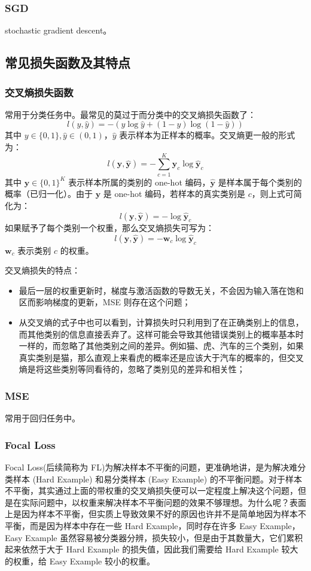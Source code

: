 \subsubsection{SGD}
stochastic gradient descent。

\subsection{常见损失函数及其特点}
\subsubsection{交叉熵损失函数}
常用于分类任务中。最常见的莫过于而分类中的交叉熵损失函数了：
$$
l(y, \hat{y}) = -(y \log \hat{y} + (1-y) \log (1-\hat{y}))
$$
其中 $y \in \{0, 1\}, \hat{y} \in (0, 1)$，$\hat y$ 表示样本为正样本的概率。交叉熵更一般的形式为：
$$
l(\boldsymbol{y}, \hat{\boldsymbol{y}}) = - \sum_{c=1}^K \boldsymbol{y}_c \log \hat{\boldsymbol{y}}_c
$$
其中 $\boldsymbol{y} \in \{0,1\}^K$ 表示样本所属的类别的 one-hot 编码，$\hat{\boldsymbol{y}}$ 是样本属于每个类别的概率（已归一化）。由于 $\boldsymbol{y}$ 是 one-hot 编码，若样本的真实类别是 $c$，则上式可简化为：
$$
l(\boldsymbol{y}, \hat{\boldsymbol{y}}) = - \log \hat{\boldsymbol{y}}_c
$$
如果赋予了每个类别一个权重，那么交叉熵损失可写为：
$$
l(\boldsymbol{y}, \hat{\boldsymbol{y}}) = - \boldsymbol{w}_c\log \hat{\boldsymbol{y}}_c
$$
$\boldsymbol{w}_c$ 表示类别 $c$ 的权重。

交叉熵损失的特点：
\begin{itemize}
	\item 最后一层的权重更新时，梯度与激活函数的导数无关，不会因为输入落在饱和区而影响梯度的更新，MSE 则存在这个问题；
	
	\item 从交叉熵的式子中也可以看到，计算损失时只利用到了在正确类别上的信息，而其他类别的信息直接丢弃了。这样可能会导致其他错误类别上的概率基本时一样的，而忽略了其他类别之间的差异。例如猫、虎、汽车的三个类别，如果真实类别是猫，那么直观上来看虎的概率还是应该大于汽车的概率的，但交叉熵是将这些类别等同看待的，忽略了类别见的差异和相关性；	
\end{itemize}


\subsubsection{MSE}
常用于回归任务中。

\subsubsection{Focal Loss}
Focal Loss(后续简称为 FL)为解决样本不平衡的问题，更准确地讲，是为解决难分类样本 (Hard Example) 和易分类样本 (Easy Example) 的不平衡问题。对于样本不平衡，其实通过上面的带权重的交叉熵损失便可以一定程度上解决这个问题，但是在实际问题中，以权重来解决样本不平衡问题的效果不够理想。为什么呢？表面上是因为样本不平衡，但实质上导致效果不好的原因也许并不是简单地因为样本不平衡，而是因为样本中存在一些 Hard Example，同时存在许多 Easy Example，Easy Example 虽然容易被分类器分辨，损失较小，但是由于其数量大，它们累积起来依然于大于 Hard Example 的损失值，因此我们需要给 Hard Example 较大的权重，给 Easy Example 较小的权重。

